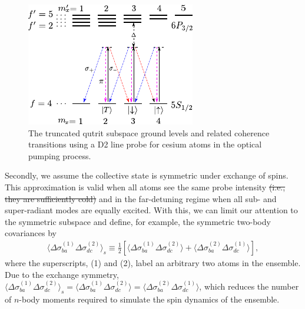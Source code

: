 \documentclass[preprint,aps,pra,onecolumn,superscriptaddress]{revtex4-1} %
\newcommand{\expect}[1]{\big\langle #1 \big\rangle}
\begin{document}
\begin{figure}[htb]
\centering
  \includegraphics[width=.45\textwidth]{fig/FaradaySqueezingLevelStructure}
  \caption{The truncated qutrit subspace ground levels and related coherence transitions using a D2 line probe for cesium atoms in the optical pumping process.}\label{fig:spinsqueezinglevelstructure}
\end{figure}

Secondly, we assume the collective state is symmetric under exchange of spins. This approximation is valid when all atoms see the same probe intensity {\color{red} \sout{(i.e., they are sufficiently cold)}} and in the far-detuning regime when all sub- and super-radiant modes are equally excited. With this, we can limit our attention to the symmetric subspace and define, for example, the symmetric two-body covariances by
\begin{align}
\expect{\Delta\sigma_{ba}^{(1)}\Delta\sigma_{dc}^{(2)}}_s \equiv \frac{1}{2}\left[\expect{\Delta\sigma_{ba}^{(1)}\Delta\sigma_{dc}^{(2)}}+\expect{\Delta\sigma_{ba}^{(2)}\Delta\sigma_{dc}^{(1)}} \right] ,
\end{align}
where the superscripts, (1) and (2), label an arbitrary two atoms in the ensemble. Due to the exchange symmetry, $ \expect{\Delta\sigma_{ba}^{(1)}\Delta\sigma_{dc}^{(2)}}_s=\expect{\Delta\sigma_{ba}^{(1)}\Delta\sigma_{dc}^{(2)}}=\expect{\Delta\sigma_{ba}^{(2)}\Delta\sigma_{dc}^{(1)}} $, which reduces the number of $ n $-body moments required to simulate the spin dynamics of the ensemble.
\end{document}
